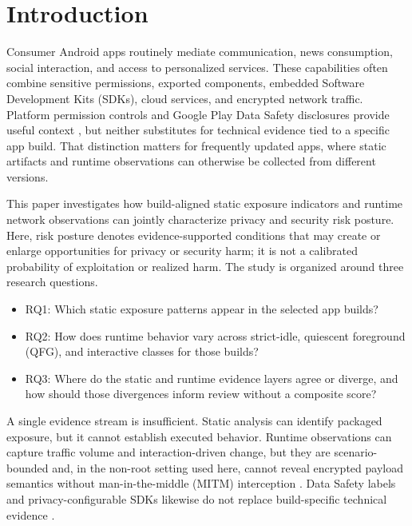 \section{Introduction}

Consumer Android apps routinely mediate communication, news consumption, social interaction, and access to personalized services. These capabilities often combine sensitive permissions, exported components, embedded Software Development Kits (SDKs), cloud services, and encrypted network traffic. Platform permission controls and Google Play Data Safety disclosures provide useful context \cite{androidPermissions2026,googlePlayDataSafety2026}, but neither substitutes for technical evidence tied to a specific app build. That distinction matters for frequently updated apps, where static artifacts and runtime observations can otherwise be collected from different versions.

This paper investigates how build-aligned static exposure indicators and runtime network observations can jointly characterize privacy and security risk posture. Here, risk posture denotes evidence-supported conditions that may create or enlarge opportunities for privacy or security harm; it is not a calibrated probability of exploitation or realized harm. The study is organized around three research questions.
\begin{itemize}
    \item RQ1: Which static exposure patterns appear in the selected app builds?
    \item RQ2: How does runtime behavior vary across strict-idle, quiescent foreground (QFG), and interactive classes for those builds?
    \item RQ3: Where do the static and runtime evidence layers agree or diverge, and how should those divergences inform review without a composite score?
\end{itemize}

A single evidence stream is insufficient. Static analysis can identify packaged exposure, but it cannot establish executed behavior. Runtime observations can capture traffic volume and interaction-driven change, but they are scenario-bounded and, in the non-root setting used here, cannot reveal encrypted payload semantics without man-in-the-middle (MITM) interception \cite{sutter2024dynamic}. Data Safety labels and privacy-configurable SDKs likewise do not replace build-specific technical evidence \cite{arkalakis2024datasafety,khandelwal2024privacylabels,zhang2024privacysdks}.

